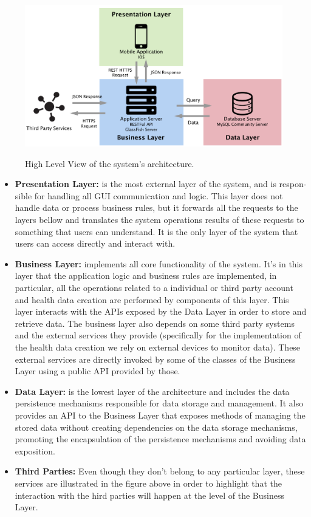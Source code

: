 \documentclass[12pt]{article}
\begin{document}
\begin{figure}[H]
\centering
\includegraphics[scale=0.6]{highLevelView.png}
\label{fig:highLevelView}
\caption{High Level View of the system's architecture.}
\end{figure}
\noindent 
\begin{itemize}
    \item \textbf{Presentation Layer:} is the most external layer of the system, and is respon- sible for handling all GUI communication and logic. This layer does not handle data or process business rules, but it forwards all the requests to the layers bellow and translates the system operations results of these requests to something that users can understand. It is the only layer of the system that users can access directly and interact with.
    \newpage
    \item \textbf{Business Layer:} implements all core functionality of the system. It's in this layer that the application logic and business rules are implemented, in particular, all the operations related to a individual or third party account and health data creation are performed by components of this layer. This layer interacts with the APIs exposed by the Data Layer in order to store and retrieve data. The business layer also depends on some third party systems and the external services they provide (specifically for the implementation of the health data creation we rely on external devices to monitor data). These external services are directly invoked by some of the classes of the Business Layer using a public API provided by those.
    \item \textbf{Data Layer:} is the lowest layer of the architecture and includes the data persistence mechanisms responsible for data storage and management. It also provides an API to the Business Layer that exposes methods of managing the stored data without creating dependencies on the data storage mechanisms, promoting the encapsulation of the persistence mechanisms and avoiding data exposition.
    \item \textbf{Third Parties:} Even though they don't belong to any particular layer, these services are illustrated in the figure above in order to highlight that the interaction with the hird parties will happen at the level of the Business Layer.
\end{itemize}
\end{document}
